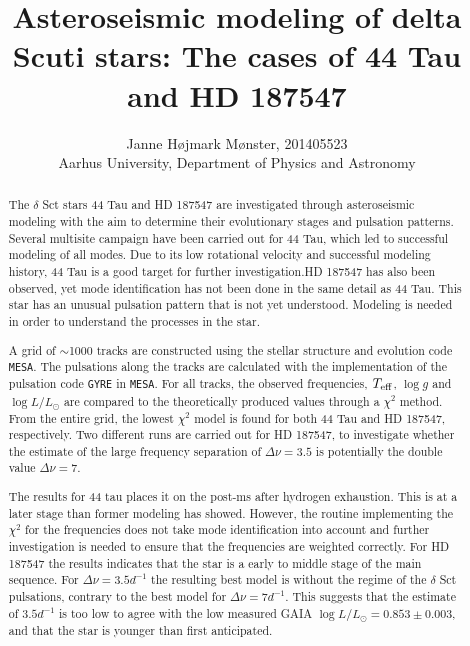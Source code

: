 \documentclass[a4paper,twoside,11pt]{memoir}
\title{Asteroseismic modeling of delta Scuti stars: The cases of 44 Tau and HD 187547}
\author{Janne Højmark Mønster, 201405523\\ Aarhus University, Department of Physics and Astronomy}
\newcommand{\chis}{\ensuremath{\chi^2}\xspace}
\newcommand{\teff}{\ensuremath{T_{\textup{eff}}}\xspace}
\newcommand{\lum}{\ensuremath{\log L / L_{\odot}}\xspace}
\newcommand{\logg}{\ensuremath{\log g}\xspace}
\begin{document}
\maketitle
\thispagestyle{empty}
\vspace{0.5cm}
\newpage
\begin{abstract}
	
	The $\delta$ Sct stars 44 Tau and HD 187547 are investigated through asteroseismic modeling with the aim to determine their evolutionary stages and pulsation patterns. Several multisite campaign have been carried out for 44 Tau, which led to successful modeling of all modes. Due to its low rotational velocity and successful modeling history, 44 Tau is a good target for further investigation.HD 187547 has also been observed, yet mode identification has not been done in the same detail as 44 Tau. This star has an unusual pulsation pattern  that is not yet understood. Modeling is needed in order to understand the processes in the star. 
	
	A grid of  $\sim$1000 tracks are constructed using the stellar structure and evolution code \texttt{MESA}. The pulsations along the tracks are calculated with the implementation of the pulsation code \texttt{GYRE} in \texttt{MESA}. For all tracks, the observed frequencies, \teff, \logg and \lum are compared to the theoretically produced values through a \chis method. From the entire grid, the lowest \chis model is found for both 44 Tau and HD 187547, respectively. Two different runs are carried out for HD 187547, to investigate whether the estimate of the large frequency separation of $\Delta\nu = 3.5$ is potentially the double value $\Delta\nu=7$. 
	
	The results for 44 tau places it on the post-ms after hydrogen exhaustion. This is at a later stage than former modeling has showed. However, the routine implementing the \chis for the frequencies does not take mode identification into account and further investigation is needed to ensure that the frequencies are weighted correctly. For HD 187547 the results indicates that the star is a early to middle stage of the main sequence.  For $\Delta\nu = 3.5 d^{-1}$ the resulting best model is without the regime of the $\delta$ Sct pulsations, contrary to the best model for $\Delta\nu = 7d^{-1}$. This suggests that the estimate of $3.5 d^{-1}$ is too low to agree with the low measured GAIA \lum$=0.853\pm0.003$, and that the star is younger than first anticipated.  
	

\end{abstract}
\newpage
\end{document}
